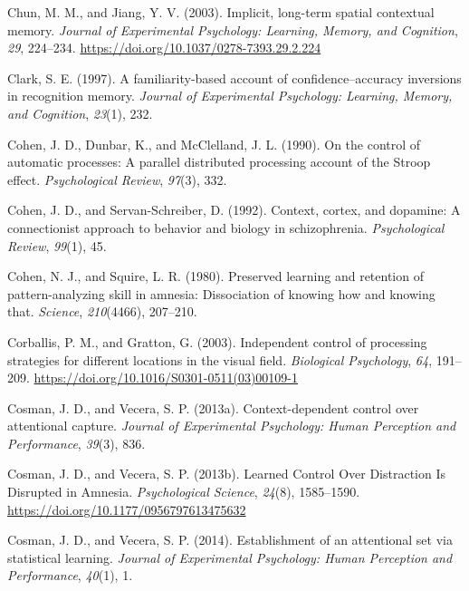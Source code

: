 \documentclass[]{DissertateCUNY}
\begin{document}
\leavevmode\hypertarget{ref-chun_implicit_2003}{}%
Chun, M. M., and Jiang, Y. V. (2003). Implicit, long-term spatial
contextual memory. \emph{Journal of Experimental Psychology: Learning,
Memory, and Cognition}, \emph{29}, 224--234.
\url{https://doi.org/10.1037/0278-7393.29.2.224}

\leavevmode\hypertarget{ref-clark_familiarity-based_1997}{}%
Clark, S. E. (1997). A familiarity-based account of confidence--accuracy
inversions in recognition memory. \emph{Journal of Experimental
Psychology: Learning, Memory, and Cognition}, \emph{23}(1), 232.

\leavevmode\hypertarget{ref-cohen_control_1990}{}%
Cohen, J. D., Dunbar, K., and McClelland, J. L. (1990). On the control
of automatic processes: A parallel distributed processing account of the
Stroop effect. \emph{Psychological Review}, \emph{97}(3), 332.

\leavevmode\hypertarget{ref-cohen_context_1992}{}%
Cohen, J. D., and Servan-Schreiber, D. (1992). Context, cortex, and
dopamine: A connectionist approach to behavior and biology in
schizophrenia. \emph{Psychological Review}, \emph{99}(1), 45.

\leavevmode\hypertarget{ref-cohen_preserved_1980}{}%
Cohen, N. J., and Squire, L. R. (1980). Preserved learning and retention
of pattern-analyzing skill in amnesia: Dissociation of knowing how and
knowing that. \emph{Science}, \emph{210}(4466), 207--210.

\leavevmode\hypertarget{ref-corballis_independent_2003}{}%
Corballis, P. M., and Gratton, G. (2003). Independent control of
processing strategies for different locations in the visual field.
\emph{Biological Psychology}, \emph{64}, 191--209.
\url{https://doi.org/10.1016/S0301-0511(03)00109-1}

\leavevmode\hypertarget{ref-cosman_context-dependent_2013}{}%
Cosman, J. D., and Vecera, S. P. (2013a). Context-dependent control over
attentional capture. \emph{Journal of Experimental Psychology: Human
Perception and Performance}, \emph{39}(3), 836.

\leavevmode\hypertarget{ref-cosman_learned_2013}{}%
Cosman, J. D., and Vecera, S. P. (2013b). Learned Control Over
Distraction Is Disrupted in Amnesia. \emph{Psychological Science},
\emph{24}(8), 1585--1590. \url{https://doi.org/10.1177/0956797613475632}

\leavevmode\hypertarget{ref-cosman_establishment_2014}{}%
Cosman, J. D., and Vecera, S. P. (2014). Establishment of an attentional
set via statistical learning. \emph{Journal of Experimental Psychology:
Human Perception and Performance}, \emph{40}(1), 1.
\end{document}
